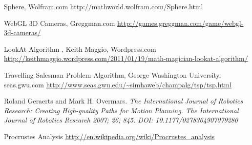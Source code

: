 


\begin{thebibliography}{99}



  \begin{flushleft} Sphere, Wolfram.com \url{http://mathworld.wolfram.com/Sphere.html}\end{flushleft}
 \begin{flushleft} WebGL 3D Cameras, Greggman.com \url{http://games.greggman.com/game/webgl-3d-cameras/}\end{flushleft}
  \begin{flushleft} LookAt Algorithm , Keith Maggio, Wordpress.com \url{http://keithmaggio.wordpress.com/2011/01/19/math-magician-lookat-algorithm/}\end{flushleft}
    \begin{flushleft} Travelling Salesman Problem Algorithm, George Washington University, seas.gwu.com \url{http://www.seas.gwu.edu/~simhaweb/champalg/tsp/tsp.html}\end{flushleft}
 Roland Geraerts and Mark H. Overmars.
  \emph{The International Journal of Robotics Research: Creating High-quality Paths for Motion Planning. The International Journal of Robotics Research 2007; 26; 845. DOI: 10.1177/0278364907079280}
\begin{flushleft}Procrustes Analysis
\url{http://en.wikipedia.org/wiki/Procrustes_analysis}\end{flushleft}

 
 



\end{thebibliography}




